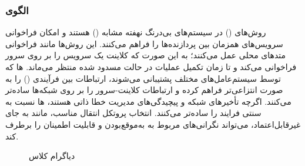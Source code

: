 \subsubsection{الگوی }
\label{distrRemMethodCallSec}
\begin{RTL}
روش‌های  () \cite{ref4}
در سیستم‌های بی‌درنگ نهفته
مشابه  () هستند
و امکان فراخوانی سرویس‌های همزمان بین پردازنده‌ها را فراهم می‌کنند.
این روش‌ها مانند فراخوانی متدهای محلی عمل می‌کنند؛
به این صورت که کلاینت یک سرویس را بر روی سرور فراخوانی می‌کند
و تا زمان تکمیل عملیات در حالت مسدود شده منتظر
می‌ماند. ها که توسط سیستم‌عامل‌های مختلف پشتیبانی می‌شوند،
ارتباطات بین فرآیندی () را به صورت انتزاعی‌تر
فراهم کرده و ارتباطات کلاینت-سرور را بر روی
شبکه‌ها ساده‌تر می‌کنند. اگرچه تأخیرهای شبکه
و پیچیدگی‌های مدیریت خطا ذاتی هستند، ها نسبت به
 سنتی فرایند را ساده‌تر می‌کنند. انتخاب پروتکل
انتقال مناسب، مانند  به جای  غیرقابل‌اعتماد،
می‌تواند نگرانی‌های مربوط به به‌موقع‌بودن و قابلیت اطمینان را برطرف کند.
\end{RTL}
\begin{figure}[h!]
\centering
{}
\caption{دیاگرام کلاس }
\label{distrRemMethodCallClassDiag}
\end{figure}